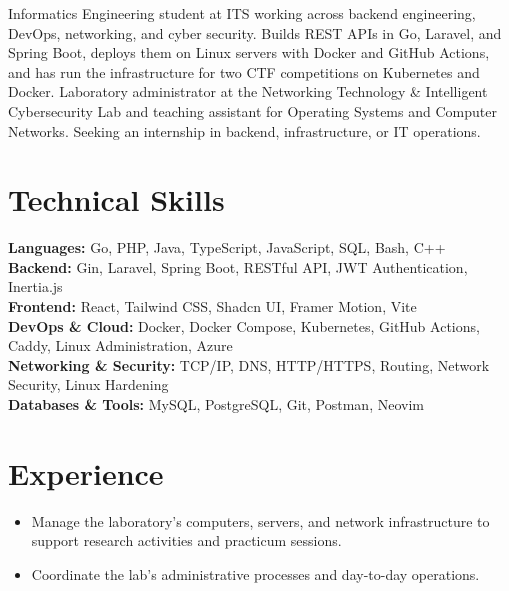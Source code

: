 



\cvheader

Informatics Engineering student at ITS working across backend engineering, DevOps, networking, and cyber security. Builds REST APIs in Go, Laravel, and Spring Boot, deploys them on Linux servers with Docker and GitHub Actions, and has run the infrastructure for two CTF competitions on Kubernetes and Docker. Laboratory administrator at the Networking Technology \& Intelligent Cybersecurity Lab and teaching assistant for Operating Systems and Computer Networks. Seeking an internship in backend, infrastructure, or IT operations.

\cveducation

\section{Technical Skills}

\textbf{Languages:} Go, PHP, Java, TypeScript, JavaScript, SQL, Bash, C++ \\
\textbf{Backend:} Gin, Laravel, Spring Boot, RESTful API, JWT Authentication, Inertia.js \\
\textbf{Frontend:} React, Tailwind CSS, Shadcn UI, Framer Motion, Vite \\
\textbf{DevOps \& Cloud:} Docker, Docker Compose, Kubernetes, GitHub Actions, Caddy, Linux Administration, Azure \\
\textbf{Networking \& Security:} TCP/IP, DNS, HTTP/HTTPS, Routing, Network Security, Linux Hardening \\
\textbf{Databases \& Tools:} MySQL, PostgreSQL, Git, Postman, Neovim

\section{Experience}

\begin{itemize}
    \item Manage the laboratory's computers, servers, and network infrastructure to support research activities and practicum sessions.
    \item Coordinate the lab's administrative processes and day-to-day operations.
\end{itemize}

